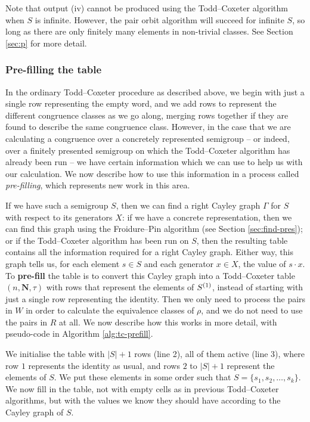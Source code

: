 Note that output (iv) cannot be produced using the Todd--Coxeter algorithm when $S$ is
infinite.  However, the pair orbit algorithm will succeed for infinite $S$, so
long as there are only finitely many elements in non-trivial classes.  See
Section \ref{sec:p} for more detail.

\subsubsection{Pre-filling the table}
\label{sec:tc-prefill}
In the ordinary Todd--Coxeter procedure as described above, we begin with just a
single row representing the empty word, and we add rows to represent the
different congruence classes as we go along, merging rows together if they are
found to describe the same congruence class.  However, in the case that we are
calculating a congruence over a concretely represented semigroup -- or indeed, over a finitely
presented semigroup on which the Todd--Coxeter algorithm has already been run -- we have certain
information which we can use to help us with our calculation.
We now describe how to use this information in a process called
\textit{pre-filling}, which represents new work in this area.

If we have such a semigroup $S$, then we can find a right Cayley graph $\Gamma$
for $S$ with respect to its generators $X$: if we have a concrete representation, then we can find
this graph using the Froidure--Pin algorithm (see Section \ref{sec:find-pres});
or if the Todd--Coxeter algorithm has been run on $S$, then the resulting table contains all
the information required for a right Cayley graph.  Either way, this graph tells us, for
each element $s \in S$ and each generator $x \in X$, the value of $s \cdot x$.
To \textbf{pre-fill} the table is to convert this Cayley graph into a
Todd--Coxeter table $(n, \mathbf{N}, \tau)$ with rows that represent the
elements of $S^{(1)}{}$, instead of starting with just a single row representing the
identity.  Then we only need to process the pairs in $W$ in order to calculate
the equivalence classes of $\rho$, and we do not need to use the pairs in $R$ at
all.  We now describe how this works in more detail, with pseudo-code in
Algorithm \ref{alg:tc-prefill}.

We initialise the table with $|S| + 1$ rows (line 2), all of them active (line
3), where row $1$ represents the identity as usual, and rows $2$ to $|S| + 1$
represent the elements of $S$.  We put these elements in some order such that
$S = \{s_1, s_2, \ldots, s_k\}$.  We now fill in the table, not with empty cells
as in previous Todd--Coxeter algorithms, but with the values we know they should
have according to the Cayley graph of $S$.

